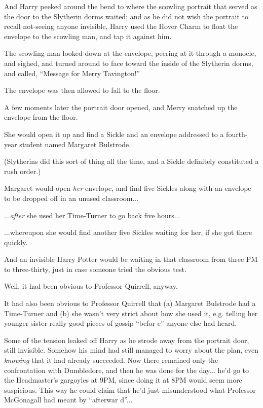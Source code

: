 And Harry peeked around the bend to where the scowling portrait that served as the door to the Slytherin dorms waited; and as he did not wish the portrait to recall not-seeing anyone invisible, Harry used the Hover Charm to float the envelope to the scowling man, and tap it against him.

The scowling man looked down at the envelope, peering at it through a monocle, and sighed, and turned around to face toward the inside of the Slytherin dorms, and called, ``Message for Merry Tavington!''

The envelope was then allowed to fall to the floor.

A few moments later the portrait door opened, and Merry snatched up the envelope from the floor.

She would open it up and find a Sickle and an envelope addressed to a fourth-year student named Margaret Bulstrode.

(Slytherins did this sort of thing all the time, and a Sickle definitely constituted a rush order.)

Margaret would open \emph{her} envelope, and find five Sickles along with an envelope to be dropped off in an unused classroom...

...\emph{after} she used her Time-Turner to go back five hours...

...whereupon she would find another five Sickles waiting for her, if she got there quickly.

And an invisible Harry Potter would be waiting in that classroom from three PM to three-thirty, just in case someone tried the obvious test.

Well, it had been obvious to Professor Quirrell, anyway.

It had also been obvious to Professor Quirrell that (a) Margaret Bulstrode had a Time-Turner and (b) she wasn't very strict about how she used it, e.g. telling her younger sister really good pieces of gossip ``befor e'' anyone else had heard.

Some of the tension leaked off Harry as he strode away from the portrait door, still invisible. Somehow his mind had still managed to worry about the plan, even \emph{knowing} that it had already succeeded. Now there remained only the confrontation with Dumbledore, and then he was done for the day... he'd go to the Headmaster's gargoyles at 9PM, since doing it at 8PM would seem more suspicious. This way he could claim that he'd just misunderstood what Professor McGonagall had meant by ``afterwar d''...

